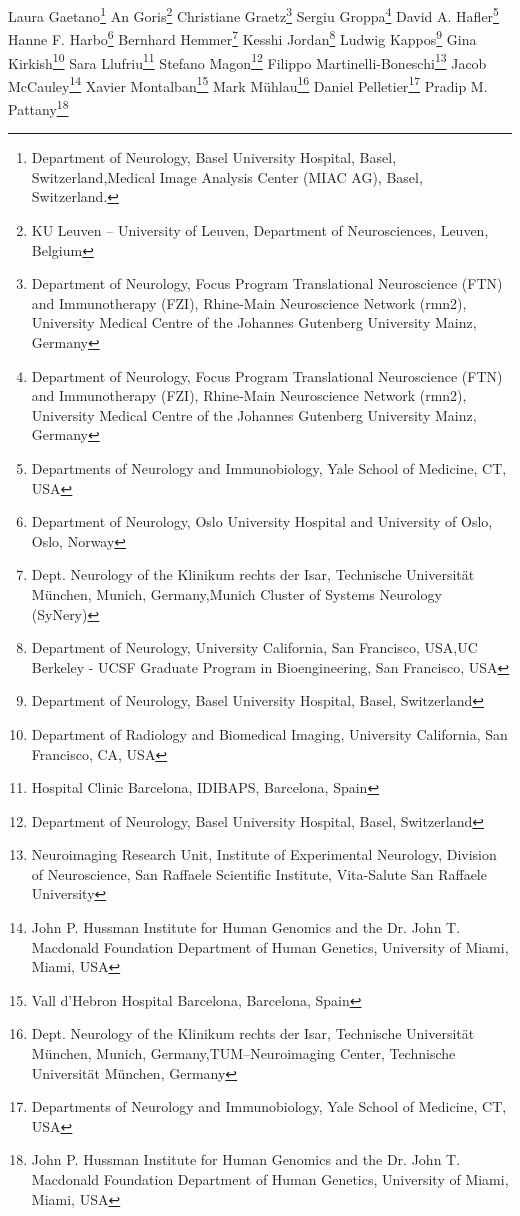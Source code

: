 Laura Gaetano\footnote[6,18]{Department of Neurology, Basel University Hospital, Basel, Switzerland,Medical Image Analysis Center (MIAC AG), Basel, Switzerland.}
An Goris\footnote[14]{ KU Leuven – University of Leuven, Department of Neurosciences, Leuven, Belgium}
Christiane Graetz\footnote[16]{Department of Neurology, Focus Program Translational Neuroscience (FTN) and Immunotherapy (FZI), Rhine-Main Neuroscience Network (rmn2), University Medical Centre of the Johannes Gutenberg University Mainz, Germany}
Sergiu Groppa\footnote[16]{Department of Neurology, Focus Program Translational Neuroscience (FTN) and Immunotherapy (FZI), Rhine-Main Neuroscience Network (rmn2), University Medical Centre of the Johannes Gutenberg University Mainz, Germany}
David A. Hafler\footnote[19]{Departments of Neurology and Immunobiology, Yale School of Medicine, CT, USA}
Hanne F. Harbo\footnote[20]{Department of Neurology, Oslo University Hospital and University of Oslo, Oslo, Norway}
Bernhard Hemmer\footnote[21,22]{Dept. Neurology of the  Klinikum rechts der Isar, Technische Universität München, Munich, Germany,Munich Cluster of Systems Neurology (SyNery)}
Kesshi Jordan\footnote[1,2]{Department of Neurology, University California, San Francisco,  USA,UC Berkeley - UCSF Graduate Program in Bioengineering, San Francisco, USA}
Ludwig Kappos\footnote[6]{Department of Neurology, Basel University Hospital, Basel, Switzerland}
Gina Kirkish\footnote[11]{Department of Radiology and Biomedical Imaging, University California, San Francisco, CA, USA}
Sara Llufriu\footnote[23]{Hospital Clinic Barcelona, IDIBAPS, Barcelona, Spain}
Stefano Magon\footnote[6]{Department of Neurology, Basel University Hospital, Basel, Switzerland}
Filippo Martinelli-Boneschi\footnote[15]{Neuroimaging Research Unit, Institute of Experimental Neurology, Division of Neuroscience, San Raffaele Scientific Institute, Vita-Salute San Raffaele University}
Jacob McCauley\footnote[24]{John P. Hussman Institute for Human Genomics and the Dr. John T. Macdonald Foundation Department of Human Genetics, University of Miami, Miami, USA}
Xavier Montalban\footnote[10]{Vall d’Hebron Hospital Barcelona, Barcelona, Spain}
Mark Mühlau\footnote[21,25]{Dept. Neurology of the  Klinikum rechts der Isar, Technische Universität München, Munich, Germany,TUM–Neuroimaging Center, Technische Universität München, Germany}
Daniel Pelletier\footnote[19]{Departments of Neurology and Immunobiology, Yale School of Medicine, CT, USA}
Pradip M. Pattany\footnote[24]{John P. Hussman Institute for Human Genomics and the Dr. John T. Macdonald Foundation Department of Human Genetics, University of Miami, Miami, USA}
